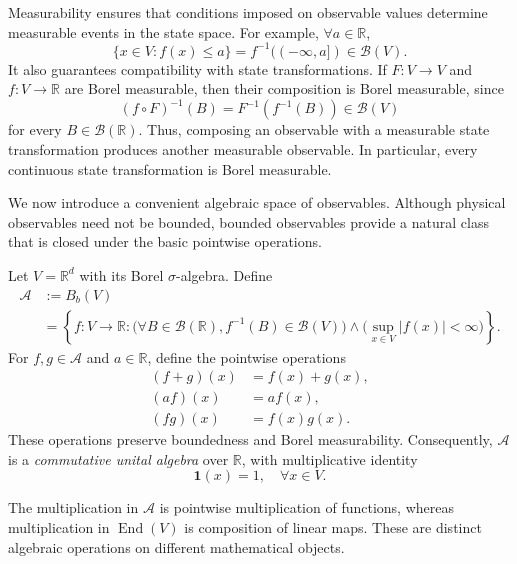 \documentclass[12pt,a4paper,oneside]{book}
\begin{document}
Measurability ensures that conditions imposed on observable values determine measurable events in the state space. For
example, $\forall a\in\mathbb R$,
\begin{equation*}
    \{x\in V:f(x)\leq a\} = f^{-1}((-\infty,a]) \in\mathcal B(V).
\end{equation*}
It also guarantees compatibility with state transformations. If $F:V\to V$ and $f:V\to\mathbb R$ are Borel measurable,
then their composition is Borel measurable, since
\begin{equation*}
    (f\circ F)^{-1}(B) = F^{-1}(f^{-1}(B)) \in\mathcal B(V)
\end{equation*}
for every $B\in\mathcal B(\mathbb R)$. Thus, composing an observable with a measurable state transformation produces another
measurable observable. In particular, every continuous state transformation is Borel measurable.

We now introduce a convenient algebraic space of observables. Although physical observables need not be bounded, bounded
observables provide a natural class that is closed under the basic pointwise operations.

\begin{definition}
Let $V=\mathbb R^d$ with its Borel $\sigma$-algebra. Define
\begin{equation*}
    \begin{aligned}
        \mathcal A &:= B_b(V) \\
        & =
        \left\{
                f:V\to\mathbb R:
                \bigl(\forall B\in\mathcal B(\mathbb R), f^{-1}(B)\in\mathcal B(V)\bigr) \land
                \bigl(\sup_{x\in V}|f(x)|<\infty\bigr)
        \right\}.
    \end{aligned}
\end{equation*}
For $f,g\in\mathcal A$ and $a\in\mathbb R$, define the pointwise operations
\begin{equation*}
\begin{aligned}
        (f+g)(x)&=f(x)+g(x),\\
        (af)(x)&=af(x),\\
        (fg)(x)&=f(x)g(x).
    \end{aligned}
\end{equation*}
These operations preserve boundedness and Borel measurability. Consequently, $\mathcal A$ is a \emph{commutative unital algebra}
over $\mathbb R$, with multiplicative identity
\begin{equation*}
    \mathbf 1(x)=1,\quad\forall x\in V.
\end{equation*}
\end{definition}
The multiplication in $\mathcal A$ is pointwise multiplication of functions, whereas multiplication in $\operatorname{End}(V)$
is composition of linear maps. These are distinct algebraic operations on different mathematical objects.
\end{document}
